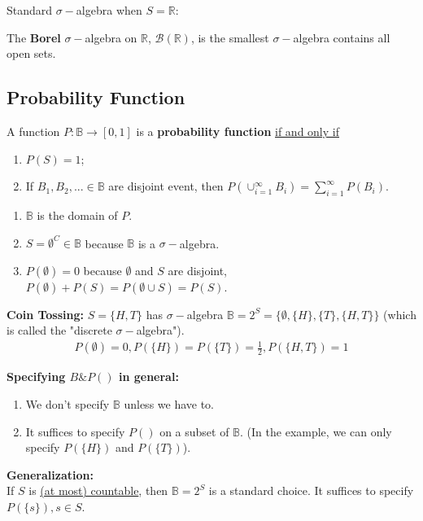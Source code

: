 \documentclass[11pt]{elegantbook}
\begin{document}
Standard $\sigma-$algebra when $S=\mathbb{R}$:
\begin{definition}
    \normalfont
    The \textbf{Borel} $\sigma-$algebra on $\mathbb{R}$, $\mathcal{B}(\mathbb{R})$, is the smallest $\sigma-$algebra contains all open sets.
\end{definition}

\subsection{Probability Function}
\begin{definition}
    \normalfont
    A function $P: \mathbb{B} \rightarrow [0,1]$ is a \textbf{probability function} \underline{if and only if}
    \begin{enumerate}
        \item $P(S)=1$;
        \item If $B_1,B_2,...\in \mathbb{B}$ are disjoint event, then $P(\cup_{i=1}^\infty B_i)=\sum_{i=1}^\infty P(B_i)$.
    \end{enumerate}
\end{definition}
\begin{note}
    \begin{enumerate}
        \item $\mathbb{B}$ is the domain of $P$.
        \item $S=\emptyset^C\in \mathbb{B}$ because $\mathbb{B}$ is a $\sigma-$algebra.
        \item $P(\emptyset)=0$ because $\emptyset$ and $S$ are disjoint, $P(\emptyset)+P(S)=P(\emptyset\cup S)=P(S)$.
    \end{enumerate}
\end{note}
\begin{example}
    \textbf{Coin Tossing:} $S=\{H,T\}$ has $\sigma-$algebra $\mathbb{B}=2^S=\{\emptyset,\{H\},\{T\},\{H,T\}\}$ (which is called the "discrete $\sigma-$algebra").
    \begin{equation}
        \begin{aligned}
            P(\emptyset)=0,P(\{H\})=P(\{T\})=\frac{1}{2},P(\{H,T\})=1
        \end{aligned}
        \nonumber
    \end{equation}
\end{example}

\begin{note}
    \textbf{Specifying $B\& P()$ in general:}
    \begin{enumerate}
        \item We don't specify $\mathbb{B}$ unless we have to.
        \item It suffices to specify $P()$ on a subset of $\mathbb{B}$. (In the example, we can only specify $P(\{H\})$ and $P(\{T\})$).
    \end{enumerate}
\end{note}
\begin{note}
    \textbf{Generalization:}\\
    If $S$ is \underline{(at most) countable}, then $\mathbb{B}=2^S$ is a standard choice. It suffices to specify $P(\{s\}), s\in S$.
\end{note}
\end{document}
